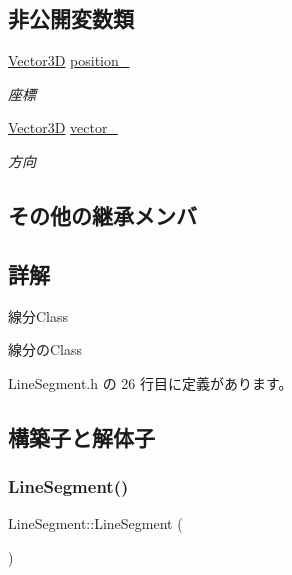 \subsection*{非公開変数類}
\begin{DoxyCompactItemize}
\item 
\mbox{\hyperlink{class_vector3_d}{Vector3D}} \mbox{\hyperlink{class_line_segment_a2b62cbe86bc97fccece2b098d83d643e}{position\+\_\+}}
\begin{DoxyCompactList}\small\item\em 座標 \end{DoxyCompactList}\item 
\mbox{\hyperlink{class_vector3_d}{Vector3D}} \mbox{\hyperlink{class_line_segment_a8a0af480c7798ce5d9975dce984cae38}{vector\+\_\+}}
\begin{DoxyCompactList}\small\item\em 方向 \end{DoxyCompactList}\end{DoxyCompactItemize}
\subsection*{その他の継承メンバ}


\subsection{詳解}
線分\+Class 

線分の\+Class 

 Line\+Segment.\+h の 26 行目に定義があります。



\subsection{構築子と解体子}
\mbox{\label{class_line_segment_a4c2da2ff2d3979f28bfcb24948a8e6a9}} 
\subsubsection{\texorpdfstring{Line\+Segment()}{LineSegment()}}
{\footnotesize\ttfamily Line\+Segment\+::\+Line\+Segment (\begin{DoxyParamCaption}{ }\end{DoxyParamCaption})}




